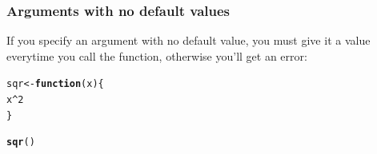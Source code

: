 \documentclass[12pt]{beamer}\usepackage[]{graphicx}\usepackage[]{color}
\makeatletter
\newcommand{\hlnum}[1]{\textcolor[rgb]{0.686,0.059,0.569}{#1}}%
\newcommand{\hlopt}[1]{\textcolor[rgb]{0,0,0}{#1}}%
\newcommand{\hlstd}[1]{\textcolor[rgb]{0.345,0.345,0.345}{#1}}%
\newcommand{\hlkwa}[1]{\textcolor[rgb]{0.161,0.373,0.58}{\textbf{#1}}}%
\newcommand{\hlkwb}[1]{\textcolor[rgb]{0.69,0.353,0.396}{#1}}%
\newcommand{\hlkwc}[1]{\textcolor[rgb]{0.333,0.667,0.333}{#1}}%
\newcommand{\hlkwd}[1]{\textcolor[rgb]{0.737,0.353,0.396}{\textbf{#1}}}%
\newenvironment{kframe}{%
 \def\at@end@of@kframe{}%
 \ifinner\ifhmode%
  \def\at@end@of@kframe{\end{minipage}}%
  \begin{minipage}{\columnwidth}%
 \fi\fi%
 \def\FrameCommand##1{\hskip\@totalleftmargin \hskip-\fboxsep
 \colorbox{shadecolor}{##1}\hskip-\fboxsep
     \hskip-\linewidth \hskip-\@totalleftmargin \hskip\columnwidth}%
 \MakeFramed {\advance\hsize-\width
   \@totalleftmargin\z@ \linewidth\hsize
   \@setminipage}}%
 {\par\unskip\endMakeFramed%
 \at@end@of@kframe}
\newenvironment{knitrout}{}{} %
\makeatother
\begin{document}

\begin{frame}[fragile]
\frametitle{Arguments with no default values}

If you specify an argument with no default value, you must give it a value everytime you call the function, otherwise you'll get an error:
\begin{knitrout}\footnotesize
{}\color{fgcolor}\begin{kframe}
\begin{alltt}
\hlstd{sqr} \hlkwb{<-} \hlkwa{function}\hlstd{(}\hlkwc{x}\hlstd{) \{}
  \hlstd{x}\hlopt{^}\hlnum{2}
\hlstd{\}}

\hlkwd{sqr}\hlstd{()}
\end{alltt}


{\ttfamily\noindent\bfseries{}}\end{kframe}
\end{knitrout}

\end{frame}

\end{document}
